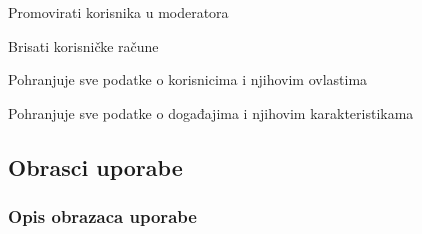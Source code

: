 \begin{packed_enum}
\begin{packed_enum}
				\end{packed_enum}
			
				\item  {}
				
				\begin{packed_enum}
					
					\item Promovirati korisnika u moderatora
					\item Brisati korisničke račune
					
				\end{packed_enum}
			
				\item  {}
				
				\begin{packed_enum}
					
					\item Pohranjuje sve podatke o korisnicima i njihovim ovlastima
					\item Pohranjuje sve podatke o događajima i njihovim karakteristikama
					
				\end{packed_enum}
			
			
			\end{packed_enum}
			
			\eject 
			
			
				
			\subsection{Obrasci uporabe}
				
				
				
				\subsubsection{Opis obrazaca uporabe}
					
					

